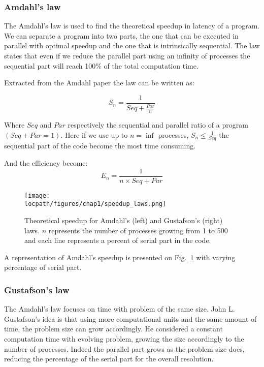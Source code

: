 \subsubsection{Amdahl's law}
The Amdahl's law\cite{amdahl1967validity} is used to find the theoretical speedup in latency of a program.
We can separate a program into two parts, the one that can be executed in parallel with optimal speedup and the one that is intrinsically sequential.
The law states that even if we reduce the parallel part using an infinity of processes the sequential part will reach 100\% of the total computation time. 

Extracted from the Amdahl paper the law can be written as: 

\begin{equation}
S_n = \frac{1}{Seq + \frac{Par}{n}}
\end{equation}

Where $Seq$ and $Par$ respectively the sequential and parallel ratio of a program $( Seq + Par = 1 )$.
Here if we use up to $n=\inf$ processes, $S_n \leq \frac{1}{Seq}$ the sequential part of the code become the most time consuming. 

And the efficiency become:
\begin{equation}
E_n = \frac{1}{n\times Seq + Par}
\end{equation}

\begin{figure}
\texttt{[image: \\locpath/figures/chap1/speedup\_laws.png]}
\caption{Theoretical speedup for Amdahl's (left) and Gustafson's (right) laws. $n$ represents the number of processes growing from 1 to 500 and each line represents a percent of serial part in the code.}
\label{fig:1_HPC:speedup_laws}
\end{figure}

A representation of Amdahl's speedup is presented on Fig.~\ref{fig:1_HPC:speedup_laws} with varying percentage of serial part. 

\subsubsection{Gustafson's law}
The Amdahl's law focuses on time with problem of the same size. 
John L. Gustafson's idea \cite{gustafson1988reevaluating} is that using more computational units and the same amount of time, the problem size can grow accordingly. 
He considered a constant computation time with evolving problem, growing the size accordingly to the number of processes. 
Indeed the parallel part grows as the problem size does, reducing the percentage of the serial part for the overall resolution.

